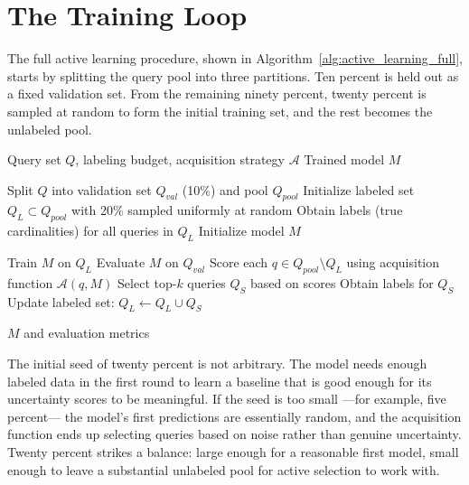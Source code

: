 \section{The Training Loop}

The full active learning procedure, shown in Algorithm~\ref{alg:active_learning_full}, starts by splitting the query pool into three partitions. Ten percent is held out as a fixed validation set. From the remaining ninety percent, twenty percent is sampled at random to form the initial training set, and the rest becomes the unlabeled pool.

\begin{algorithm}[htbp]
\caption{Active Learning for Cardinality Estimation}
\label{alg:active_learning_full}
\begin{algorithmic}[1]
\Require Query set $Q$, labeling budget, acquisition strategy $\mathcal{A}$
\Ensure Trained model $M$

\State Split $Q$ into validation set $Q_{val}$ (10\%) and pool $Q_{pool}$
\State Initialize labeled set $Q_L \subset Q_{pool}$ with 20\% sampled uniformly at random
\State Obtain labels (true cardinalities) for all queries in $Q_L$
\State Initialize model $M$

    \State Train $M$ on $Q_L$
    \State Evaluate $M$ on $Q_{val}$
    \State Score each $q \in Q_{pool} \setminus Q_L$ using acquisition function $\mathcal{A}(q, M)$
    \State Select top-$k$ queries $Q_S$ based on scores
    \State Obtain labels for $Q_S$
    \State Update labeled set: $Q_L \gets Q_L \cup Q_S$
\EndFor

\State \Return $M$ and evaluation metrics
\end{algorithmic}
\end{algorithm}

The initial seed of twenty percent is not arbitrary. The model needs enough labeled data in the first round to learn a baseline that is good enough for its uncertainty scores to be meaningful. If the seed is too small ---for example, five percent--- the model's first predictions are essentially random, and the acquisition function ends up selecting queries based on noise rather than genuine uncertainty. Twenty percent strikes a balance: large enough for a reasonable first model, small enough to leave a substantial unlabeled pool for active selection to work with.

